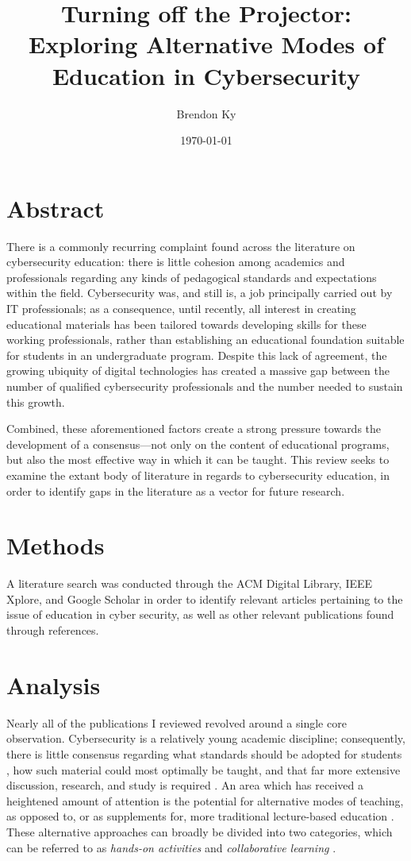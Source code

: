 \documentclass{article}
\title{
    Turning off the Projector: \\
    \large Exploring Alternative Modes of Education in Cybersecurity
}
\author{Brendon Ky}
\date{\today}
\begin{document}
\maketitle

\section{Abstract}

    There is a commonly recurring complaint found across the literature on cybersecurity education:
    there is little cohesion among academics and professionals regarding any kinds of pedagogical standards and expectations within the field. 
    Cybersecurity was, and still is, a job principally carried out by IT professionals; 
    as a consequence, until recently, all interest in creating educational  materials has been tailored towards developing skills for these working professionals, rather than establishing an educational foundation suitable for students in an undergraduate program. 
    Despite this lack of agreement, the growing ubiquity of digital technologies has created a massive gap between the number of qualified cybersecurity professionals and the number needed to sustain this growth. 
    
    Combined, these aforementioned factors create a strong pressure towards the development of a consensus---not only on the content of educational programs, but also the most effective way in which it can be taught. 
    This review seeks to examine the extant body of literature in regards to cybersecurity education, in order to identify gaps in the literature as a vector for future research.

\section{Methods}

    A literature search was conducted through the ACM Digital Library, IEEE Xplore, and Google Scholar in order to identify relevant articles pertaining to the issue of education in cyber security, as well as other relevant publications found through references.

\section{Analysis}

    Nearly all of the publications I reviewed revolved around a single core observation. 
    Cybersecurity is a relatively young academic discipline; 
    consequently, there is little consensus regarding what standards should be adopted for students \cite{R-Raj}, how such material could most optimally be taught, and that far more extensive discussion, research, and study is required \cite{Z-Zeng}. 
    An area which has received a heightened amount of attention is the potential for alternative modes of teaching, as opposed to, or as supplements for, more traditional lecture-based education \cite{Z-Zeng,N-Eliot,E-Gavas,C-Herr,K-Chung, C-Kussmaul,K-Leune,B-Payne,L-Thomas}. 
    These alternative approaches can broadly be divided into two categories, which can be referred to as \emph{hands-on activities} and \emph{collaborative learning} \cite{P-Deshpande,C-Kussmaul,B-Payne}.
\end{document}
